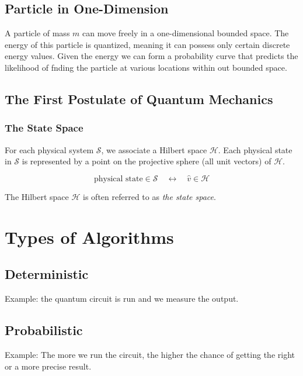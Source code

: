 \documentclass{article}
\begin{document}
\subsection{Particle in One-Dimension}

A particle of mass \(m\) can move freely in a one-dimensional bounded space.
The energy of this particle is quantized, meaning it can possess only certain discrete energy values.
Given the energy we can form a probability curve that predicts the likelihood of fnding the particle at various locations within out bounded space.

\subsection{The First Postulate of Quantum Mechanics}

\subsubsection{The State Space}

For each physical system \(\mathscr{S}\), we associate a Hilbert space \(\mathcal{H}\).
Each physical state in \(\mathscr{S}\) is represented by a point on the projective sphere (all unit vectors) of \(\mathcal{H}\).

\[
    \text{physical state} \in \mathscr{S} \quad\longleftrightarrow\quad \hat{v} \in \mathcal{H}
\]

The Hilbert space \(\mathcal{H}\) is often referred to as \textit{the state space}.





\pagebreak

\section{Types of Algorithms}

\subsection{Deterministic}

Example: the quantum circuit is run and we measure the output.

\subsection{Probabilistic}

Example: The more we run the circuit, the higher the chance of getting the right or a more precise result.

\pagebreak

\nocite{*} %

\printbibliography[heading=subbibliography, title=Bibliography]
\end{document}
